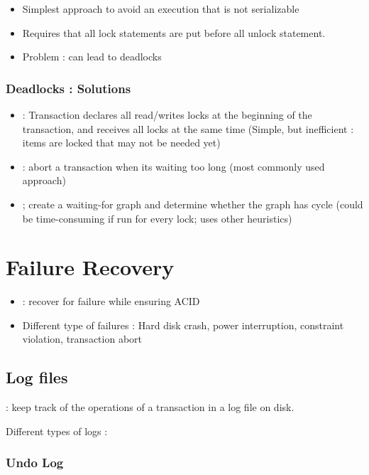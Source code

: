 \begin{itemize}
    \item Simplest approach to avoid an execution that is not serializable
    \item Requires that all lock statements are put before all unlock statement.
    \item Problem : can lead to deadlocks
\end{itemize}

\subsubsection{Deadlocks : Solutions}

\begin{itemize}
    \item {} : Transaction declares all read/writes locks at the beginning of the transaction, and receives all locks at the same time (Simple, but inefficient : items are locked that may not be needed yet)
    \item {} : abort a transaction when its waiting too long (most commonly used approach)
    \item {} ; create a waiting-for graph and determine whether the graph has cycle (could be time-consuming if run for every lock; uses other heuristics)
\end{itemize}

\section{Failure Recovery}

\begin{itemize}
    \item {} : recover for failure while ensuring ACID
    \item Different type of failures : Hard disk crash, power interruption, constraint violation, transaction abort
\end{itemize}

\subsection{Log files}

 : keep track of the operations of a transaction in a log file on disk.

Different types of logs :

\subsubsection{Undo Log}

